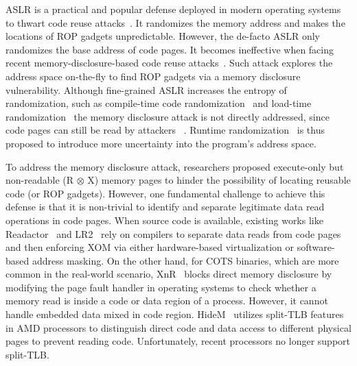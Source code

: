 ASLR is a practical and popular defense deployed in modern operating systems to thwart code reuse attacks~\cite{aslr}. It randomizes the memory address and makes the locations of ROP gadgets unpredictable. However, the de-facto ASLR only randomizes the base address of code pages. It becomes ineffective when facing recent memory-disclosure-based code reuse attacks~\cite{brop,jitrop}. Such attack explores the address space on-the-fly to find ROP gadgets via a memory disclosure vulnerability. Although fine-grained ASLR increases the entropy of randomization, such as compile-time code randomization~\cite{bhatkar2005efficient} and load-time randomization~\cite{davi2013gadge,ilr,aslp,binstir,ccr} the memory disclosure attack is not directly addressed, since code pages can still be read by attackers ~\cite{jitrop}. Runtime randomization~\cite{isomeron,remix,timelyrandom} is thus proposed to introduce more uncertainty into the program's address space.

To address the memory disclosure attack, researchers proposed execute-only but non-readable (R $\otimes$ X) memory pages to hinder the possibility of locating reusable code (or ROP gadgets). However, one fundamental challenge to achieve this defense is that it is non-trivial to identify and separate legitimate data read operations in code pages. 
When source code is available, existing works like Readactor~\cite{readactor,readactorpluplu} and LR2~\cite{lr2} rely on compilers to separate data reads from code pages and then enforcing XOM via either hardware-based virtualization or software-based address masking. On the other hand, for COTS binaries, which are more common in the real-world scenario, XnR~\cite{xnr} blocks direct memory disclosure by modifying the page fault handler in operating systems to check whether a memory read is inside a code or data region of a process. However, it cannot handle embedded data mixed in code region. HideM~\cite{hidem} utilizes split-TLB features in AMD processors to distinguish direct code and data access to different physical pages to prevent reading code. Unfortunately, recent processors no longer support split-TLB.


